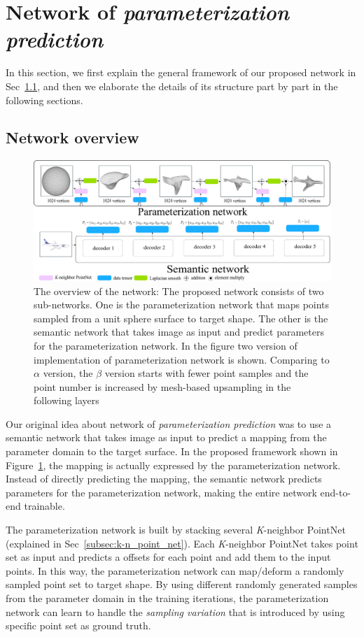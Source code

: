 \section{Network of \emph{parameterization prediction}}
In this section, we first explain the general framework of our proposed network in Sec~\ref{subsec:overview}, and then we elaborate the details of its structure part by part in the following sections.
\subsection{Network overview}
\label{subsec:overview}
\begin{figure}[htbp]
	\centering
	\includegraphics[width=\linewidth]{img/net/overview}
	\caption{The overview of the network: The proposed network consists of two sub-networks. One is the parameterization network that maps points sampled from a unit sphere surface to target shape. The other is the semantic network that takes image as input and predict parameters for the parameterization network. In the figure two version of implementation of parameterization network is shown. Comparing to $\alpha$ version, the $\beta$ version starts with fewer point samples and the point number is increased by mesh-based upsampling in the following layers}
	\label{fig:overview}
\end{figure}
Our original idea about network of \emph{parameterization prediction} was to use a semantic network that takes image as input to predict a mapping from the parameter domain to the target surface. In the proposed framework shown in Figure~\ref{fig:overview}, the mapping is actually expressed by the parameterization network. Instead of directly predicting the mapping, the semantic network predicts parameters for the parameterization network, making the entire network end-to-end trainable.

The parameterization network is built by stacking several \textit{K}-neighbor PointNet (explained in Sec~\ref{subsec:k-n_point_net}). Each \textit{K}-neighbor PointNet takes point set as input and predicts a offsets for each point and add them to the input points. In this way, the parameterization network can map/deform a randomly sampled point set to target shape. By using different randomly generated samples from the parameter domain in the training iterations, the parameterization network can learn to handle the \textit{sampling variation} that is introduced by using specific point set as ground truth. 

